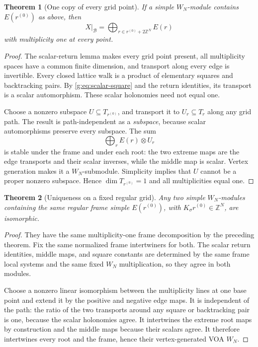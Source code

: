 \documentclass[11pt,a4paper]{article}
\numberwithin{equation}{section}
\newtheorem{theorem}{Theorem}[section]
\theoremstyle{definition}\newtheorem{definition}[theorem]{Definition}
\theoremstyle{remark}\newtheorem{remark}[theorem]{Remark}
\begin{document}
\begin{theorem}[One copy of every grid point]
\label{g:thm:generic-grid-multiplicity-one}
If a simple $W_N$-module contains $E(r^{(0)})$ as above, then
\[
 X\big|_{\mathcal B}
       =\bigoplus_{r\in r^{(0)}+2\mathbb Z^N}E(r)
\]
with multiplicity one at every point.
\end{theorem}
\begin{proof}
The scalar-return lemma makes every grid point present, all
multiplicity spaces have a common finite dimension, and transport
along every edge is invertible. Every closed lattice walk is a
product of elementary squares and backtracking pairs. By \eqref{g:eq:scalar-square} and
the return identities, its transport is a scalar automorphism.
These scalar holonomies need not equal one.

Choose a nonzero subspace $U\subseteq T_{r^{(0)}}$, and transport
it to $U_r\subseteq T_r$ along any grid path. The result is
path-independent as a \emph{subspace}, because scalar
automorphisms preserve every subspace. The sum
\[
                       \bigoplus_r E(r)\otimes U_r
\]
is stable under the frame and under each root: the two extreme
maps are the edge transports and their scalar inverses, while
the middle map is scalar. Vertex generation makes it a
$W_N$-submodule. Simplicity implies that $U$ cannot be a proper
nonzero subspace. Hence $\dim T_{r^{(0)}}=1$ and all
multiplicities equal one.
\end{proof}

\begin{theorem}[Uniqueness on a fixed regular grid]
\label{g:thm:generic-grid-uniqueness}
Any two simple $W_N$-modules containing the same regular frame
simple $E(r^{(0)})$, with $K_\sigma r^{(0)}\in\mathbb Z^N$,
are isomorphic.
\end{theorem}
\begin{proof}
They have the same multiplicity-one frame decomposition by the
preceding theorem. Fix the same normalized frame intertwiners for
both. The scalar return identities, middle maps, and square
constants are determined by the same frame local systems and
the same fixed $W_N$ multiplication, so they agree in both modules.

Choose a nonzero linear isomorphism between the multiplicity lines
at one base point and extend it by the positive and negative edge
maps. It is independent of the path: the ratio of the two
transports around any square or backtracking pair is one,
because the scalar holonomies agree. It intertwines the extreme
root maps by construction and the middle maps because their
scalars agree. It therefore intertwines every root and the frame,
hence their vertex-generated VOA $W_N$.
\end{proof}
\end{document}
